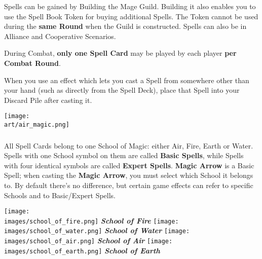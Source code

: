 \begin{multicols*}{2}
Spells can be gained by Building the Mage Guild.
Building it also enables you to use the Spell Book Token for buying additional Spells.
The Token cannot be used during the \textbf{same Round} when the Guild is constructed. Spells can also be  in Alliance and Cooperative Scenarios.

During Combat, \textbf{only one Spell Card} may be played by each player \textbf{per Combat Round}.

\columnbreak
When you use an effect which lets you cast a Spell from somewhere other than your hand (such as directly from the Spell Deck), place that Spell into your Discard Pile after casting it.

\begin{center}
  \vspace*{\fill}
  {\texttt{[image: \\art/air\_magic.png]}}
  \vspace*{\fill}
\end{center}

\subsubsection*{}
All Spell Cards belong to one School of Magic: either Air, Fire, Earth or Water.
Spells with one School symbol on them are called \textbf{Basic Spells}, while Spells with four identical symbols are called \textbf{Expert Spells}.
\textbf{Magic Arrow} is a Basic Spell; when casting the \textbf{Magic Arrow}, you must select which School it belongs to.
By default there's no difference, but certain game effects can refer to specific Schools and to Basic/Expert Spells.

\begin{minipage}[t]{0.48\textwidth}
  \centering
    \centering
    \texttt{[image: \\images/school\_of\_fire.png]}
    \textit{\textbf{\textcolor{darkcandyapplered}{School of Fire}}}
  \endminipage
    \centering
    \texttt{[image: \\images/school\_of\_water.png]}
    \textit{\textbf{\textcolor{darkcandyapplered}{School of Water}}}
  \endminipage
  \hfill\allowbreak%
  \bigbreak
    \centering
    \texttt{[image: \\images/school\_of\_air.png]}
    \textit{\textbf{\textcolor{darkcandyapplered}{School of Air}}}
  \endminipage
    \centering
    \texttt{[image: \\images/school\_of\_earth.png]}
    \textit{\textbf{\textcolor{darkcandyapplered}{School of Earth}}}
  \endminipage
  \bigbreak
\end{minipage}


\end{multicols*}
